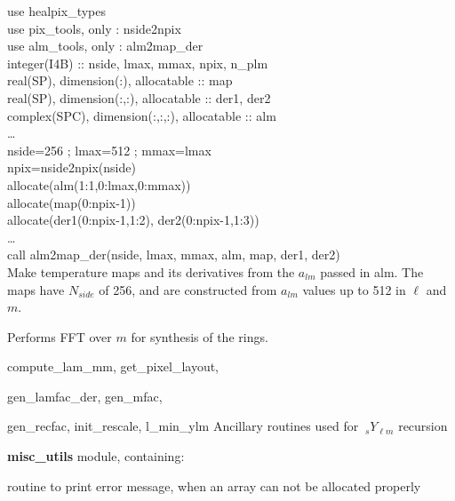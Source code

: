 \begin{example}
{
use healpix\_types \\
use pix\_tools, only : nside2npix \\
use alm\_tools, only : alm2map\_der \\
integer(I4B) :: nside, lmax, mmax, npix, n\_plm\\
real(SP), dimension(:), allocatable :: map \\
real(SP), dimension(:,:), allocatable :: der1, der2 \\
complex(SPC), dimension(:,:,:), allocatable :: alm \\
\ldots \\
nside=256 ; lmax=512 ; mmax=lmax\\
npix=nside2npix(nside)\\
allocate(alm(1:1,0:lmax,0:mmax))\\
allocate(map(0:npix-1))\\
allocate(der1(0:npix-1,1:2), der2(0:npix-1,1:3))\\
\ldots \\
call alm2map\_der(nside, lmax, mmax, alm, map, der1, der2)  \\
}
{
Make temperature maps and its derivatives from the $a_{lm}$ passed in alm. The maps have $N_{side}$ of 256, and are constructed from $a_{lm}$ values up to 512 in $\ell$ and $m$.
}
\end{example}

\begin{modules}
  \begin{sulist}{} %
  \item[\htmlref{ring\_synthesis}{sub:ring_synthesis}] Performs FFT over $m$ for synthesis of the rings.
  \item[compute\_lam\_mm, get\_pixel\_layout, ]
  \item[gen\_lamfac\_der, gen\_mfac,  ] 
  \item[gen\_recfac, init\_rescale, l\_min\_ylm] Ancillary routines used
  for $\ {_s}Y_{\ell m}$ recursion
  \item[\textbf{misc\_utils}] module, containing:
  \item[\htmlref{assert\_alloc}{sub:assert}] routine to print error message, when an array can not be
  allocated properly
  \end{sulist}
\end{modules}

